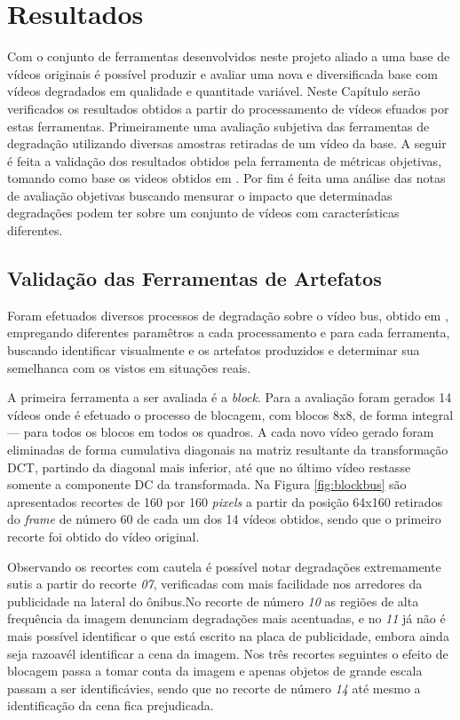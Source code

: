 
\chapter{Resultados} %

Com o conjunto de ferramentas desenvolvidos neste projeto aliado a uma base de vídeos originais é possível produzir e avaliar uma nova e diversificada base com vídeos degradados em qualidade e quantitade variável.
Neste Capítulo serão verificados os resultados obtidos a partir do processamento de vídeos efuados por estas ferramentas. Primeiramente uma avaliação subjetiva das ferramentas de degradação utilizando diversas amostras retiradas de um vídeo da base. A seguir é feita a validação dos resultados obtidos pela ferramenta de métricas objetivas, tomando como base os videos obtidos em \cite{xxx}.
Por fim é feita uma análise das notas de avaliação objetivas buscando mensurar o impacto que determinadas degradações podem ter sobre um conjunto de vídeos com características diferentes.

\section{Validação das Ferramentas de Artefatos}

Foram efetuados diversos processos de degradação sobre o vídeo bus, obtido em \cite{tracevideoseq},  empregando diferentes paramêtros a cada processamento e para cada ferramenta, buscando identificar visualmente e os artefatos produzidos e determinar sua semelhanca com os vistos em situações reais.

A primeira ferramenta a ser avaliada é a \emph{block}.
Para a avaliação foram gerados 14 vídeos onde é efetuado o processo de blocagem, com blocos 8x8, de forma integral --- para todos os blocos em todos os quadros. A cada novo vídeo gerado foram eliminadas de forma cumulativa diagonais na matriz resultante da transformação DCT, partindo da diagonal mais inferior, até que no último vídeo restasse somente a componente DC da transformada. 
Na Figura \ref{fig:blockbus} são apresentados recortes de 160 por 160 \emph{pixels} a partir da posição 64x160 retirados do \emph{frame} de número 60 de cada um dos 14 vídeos obtidos, sendo que o primeiro recorte foi obtido do vídeo original.

Observando os recortes com cautela é possível notar degradações extremamente sutis a partir do recorte \emph{07}, verificadas com mais facilidade nos arredores da publicidade na lateral do ônibus.No recorte de número \emph{10} as regiões de alta frequência da imagem denunciam degradações mais acentuadas, e no \emph{11} já não é mais possível identificar o que está escrito na placa de publicidade, embora ainda seja razoavél identificar a cena da imagem.
Nos três recortes seguintes o efeito de blocagem passa a tomar conta da imagem e apenas objetos de grande escala passam a ser identificávies, sendo que no recorte de número \emph{14} até mesmo a identificação da cena fica prejudicada.

